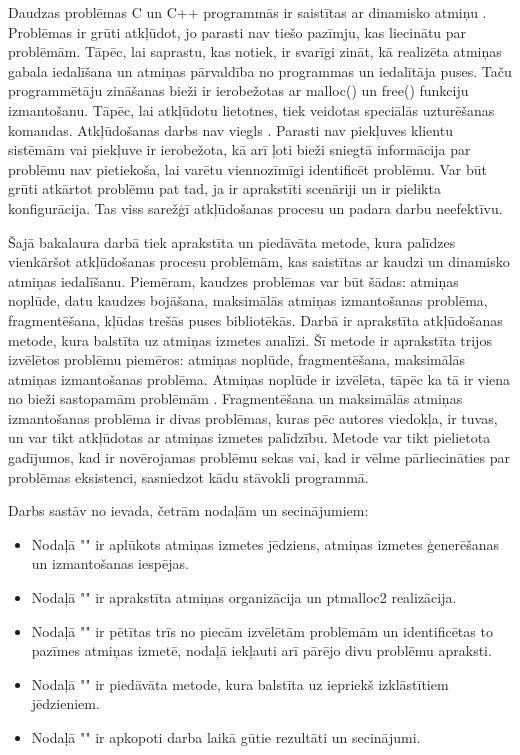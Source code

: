 ﻿Daudzas problēmas C un C++ programmās ir saistītas ar dinamisko atmiņu \cite{TFM}.
Problēmas ir grūti atkļūdot, jo parasti nav tiešo pazīmju, kas liecinātu par problēmām.
Tāpēc, lai saprastu, kas notiek, ir svarīgi zināt, kā realizēta atmiņas gabala iedalīšana un atmiņas pārvaldība no programmas un iedalītāja puses.
Taču programmētāju zināšanas bieži ir ierobežotas ar malloc() un free() funkciju izmantošanu. 
Tāpēc, lai atkļūdotu lietotnes, tiek veidotas speciālās uzturēšanas komandas.
Atkļūdošanas darbs nav viegls \cite{ER}. Parasti nav piekļuves klientu sistēmām vai piekļuve ir ierobežota, kā arī ļoti bieži sniegtā informācija par problēmu nav pietiekoša, lai varētu viennozīmīgi identificēt problēmu.
Var būt grūti atkārtot problēmu pat tad, ja ir aprakstīti scenāriji un ir pielikta konfigurācija.
Tas viss sarežģī atkļūdošanas procesu un padara darbu neefektīvu.

Šajā bakalaura darbā tiek aprakstīta un piedāvāta metode, kura palīdzes vienkāršot atkļūdošanas procesu problēmām, kas saistītas ar kaudzi un dinamisko atmiņas iedalīšanu.
Piemēram, kaudzes problēmas var būt šādas: atmiņas noplūde, datu kaudzes bojāšana, maksimālās atmiņas izmantošanas problēma, fragmentēšana, kļūdas trešās puses bibliotēkās.
Darbā ir aprakstīta atkļūdošanas metode, kura balstīta uz atmiņas izmetes analīzi.
Šī metode ir aprakstīta trijos izvēlētos problēmu piemēros: atmiņas noplūde, fragmentēšana, maksimālās atmiņas izmantošanas problēma.
Atmiņas noplūde ir izvēlēta, tāpēc ka tā ir viena no bieži sastopamām problēmām \cite{GNED}.
Fragmentēšana un maksimālās atmiņas izmantošanas problēma ir divas problēmas, kuras pēc autores viedokļa, ir tuvas, un var tikt atkļūdotas ar atmiņas izmetes palīdzību.
Metode var tikt pielietota gadījumos, kad ir novērojamas problēmu sekas vai, kad ir vēlme pārliecināties par problēmas eksistenci, sasniedzot kādu stāvokli programmā.



Darbs sastāv no ievada, četrām nodaļām un secinājumiem:
\begin{itemize}
    \item Nodaļā "{\@nodone}" ir aplūkots atmiņas izmetes jēdziens, atmiņas izmetes ģenerēšanas un izmantošanas iespējas.
    \item Nodaļā "{\@nodtwo}" ir aprakstīta atmiņas organizācija un  ptmalloc2 realizācija. 
    \item Nodaļā "{\@nodthree}" ir pētītas trīs no piecām izvēlētām problēmām un identificētas to pazīmes atmiņas izmetē, nodaļā iekļauti arī pārējo divu problēmu apraksti.
    \item Nodaļā "{\@nodfour}" ir piedāvāta metode, kura balstīta uz iepriekš izklāstītiem jēdzieniem.
    \item Nodaļā "{\@nodsix}" ir apkopoti darba laikā gūtie rezultāti un secinājumi.
\end{itemize} 
